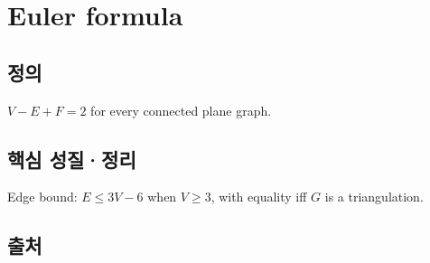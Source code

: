 \section{Euler formula}

\subsection*{정의}
$V - E + F = 2$ for every connected plane graph.

\subsection*{핵심 성질·정리}
Edge bound: $E \le 3V - 6$ when $V \ge 3$, with equality iff $G$ is a triangulation.

\subsection*{출처}
\cite{sample2020kempe}
